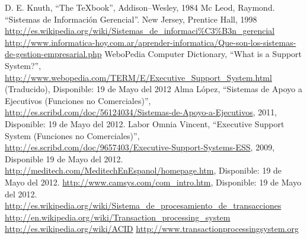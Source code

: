 \begin{thebibliography}{13}
	\bibitem {} D. E. Knuth, ``The TeXbook'', Addison--Wesley, 1984
	\bibitem {} Mc Leod, Raymond. ``Sistemas de Información Gerencial''. New Jersey, Prentice Hall, 1998
	\bibitem {} {\url{http://es.wikipedia.org/wiki/Sistemas_de_informaci%C3%B3n_gerencial}}
	\bibitem {} {\url{http://www.informatica-hoy.com.ar/aprender-informatica/Que-son-los-sistemas-de-gestion-empresarial.php}}
	\bibitem {} WeboPedia Computer Dictionary, ``What is a Support System?'', {\url{ http://www.webopedia.com/TERM/E/Executive_Support_System.html}} (Traducido), Disponible: 19 de Mayo del 2012
	\bibitem {} Alma López, ``Sistemas de Apoyo a Ejecutivos (Funciones no Comerciales)'',{\url{ http://es.scribd.com/doc/56124034/Sistemas-de-Apoyo-a-Ejecutivos}}, 2011, Disponible: 19 de Mayo del 2012.
	\bibitem {} Labor Omnia Vincent, ``Executive Support System (Funciones no Comerciales)'', {\url{http://es.scribd.com/doc/9657403/Executive-Support-Systems-ESS}}, 2009, Disponible 19 de Mayo del 2012.
	\bibitem {} {\url{http://meditech.com/MeditechEnEspanol/homepage.htm}}, Disponible: 19 de Mayo del 2012.
	\bibitem {} {\url{http://www.camsys.com/com_intro.htm}}, Disponible: 19 de Mayo del 2012.
	\bibitem {} {\url{http://es.wikipedia.org/wiki/Sistema_de_procesamiento_de_transacciones}}
	\bibitem {} {\url{http://en.wikipedia.org/wiki/Transaction_processing_system}}
	\bibitem {} {\url{http://es.wikipedia.org/wiki/ACID}}
	\bibitem {} {\url{http://www.transactionprocessingsystem.org}}
\end{thebibliography}
